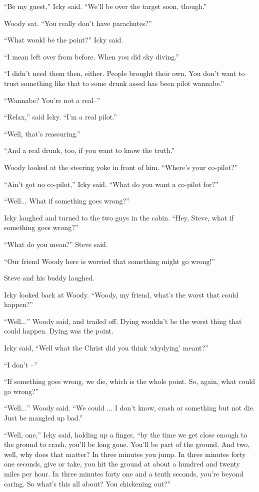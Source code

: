 ``Be my guest,'' Icky said. ``We'll be over the target soon, though.''

Woody sat. ``You really don't have parachutes?''

``What would be the point?'' Icky said.

``I mean left over from before. When you did sky diving.''

``I didn't need them then, either. People brought their own. You don't want to trust something like that to some drunk assed has been pilot wannabe.''

``Wannabe? You're not a real–''

``Relax,'' said Icky. ``I'm a real pilot.''

``Well, that's reassuring.''

``And a real drunk, too, if you want to know the truth.''

Woody looked at the steering yoke in front of him. ``Where's your co-pilot?''

``Ain't got no co-pilot,'' Icky said. ``What do you want a co-pilot for?''

``Well$\ldots$ What if something goes wrong?''

Icky laughed and turned to the two guys in the cabin. ``Hey, Steve, what if something goes wrong?''

``What do you mean?'' Steve said.

``Our friend Woody here is worried that something might go wrong!''

Steve and his buddy laughed.

Icky looked back at Woody. ``Woody, my friend, what's the worst that could happen?''

``Well$\ldots$'' Woody said, and trailed off. Dying wouldn't be the worst thing that could happen. Dying was the point.

Icky said, ``Well what the Christ did you think `skydying' meant?''

``I don't –''

``If something goes wrong, we die, which is the whole point. So, again, what could go wrong?''

``Well$\ldots$'' Woody said. ``We could $\ldots$ I don't know, crash or something but not die. Just be mangled up bad.''

``Well, one,'' Icky said, holding up a finger, ``by the time we get close enough to the ground to crash, you'll be long gone. You'll be part of the ground. And two, well, why does that matter? In three minutes you jump. In three minutes forty one seconds, give or take, you hit the ground at about a hundred and twenty miles per hour. In three minutes forty one and a tenth seconds, you're beyond caring. So what's this all about? You chickening out?''

